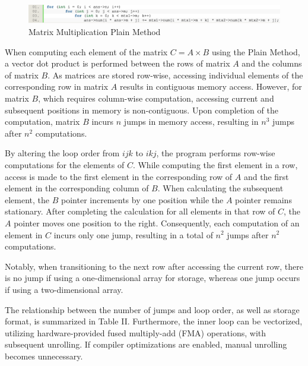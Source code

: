 \documentclass[conference]{IEEEtran}
\begin{document}
\begin{figure}[htbp]
\centering
\includegraphics [width=0.95\linewidth]{pictures/plain.png}
\caption{Matrix Multiplication Plain Method}
\label{fig9}
\end{figure}

When computing each element of the matrix \( C = A \times B \) using the Plain Method, a vector dot product is performed between the rows of matrix \( A \) and the columns of matrix \( B \). As matrices are stored row-wise, accessing individual elements of the corresponding row in matrix \( A \) results in contiguous memory access. However, for matrix \( B \), which requires column-wise computation, accessing current and subsequent positions in memory is non-contiguous. Upon completion of the computation, matrix \( B \) incurs \( n \) jumps in memory access, resulting in \( n^3 \) jumps after \( n^2 \) computations.

By altering the loop order from \( ijk \) to \( ikj \), the program performs row-wise computations for the elements of \( C \). While computing the first element in a row, access is made to the first element in the corresponding row of \( A \) and the first element in the corresponding column of \( B \). When calculating the subsequent element, the \( B \) pointer increments by one position while the \( A \) pointer remains stationary. After completing the calculation for all elements in that row of \( C \), the \( A \) pointer moves one position to the right. Consequently, each computation of an element in \( C \) incurs only one jump, resulting in a total of \( n^2 \) jumps after \( n^2 \) computations.

Notably, when transitioning to the next row after accessing the current row, there is no jump if using a one-dimensional array for storage, whereas one jump occurs if using a two-dimensional array.

The relationship between the number of jumps and loop order, as well as storage format, is summarized in Table II. Furthermore, the inner loop can be vectorized, utilizing hardware-provided fused multiply-add (FMA) operations, with subsequent unrolling. If compiler optimizations are enabled, manual unrolling becomes unnecessary.
\end{document}

